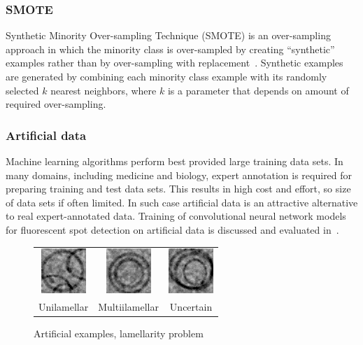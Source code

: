 \documentclass[a4paper, 11pt, table]{article}
\begin{document}
\subsubsection{SMOTE}
Synthetic Minority Over-sampling Technique (SMOTE) is an over-sampling approach in which the minority class is over-sampled by creating “synthetic” examples rather than by over-sampling with replacement~\cite{smote_chawla}. 
Synthetic examples are generated by combining each minority class example with its randomly selected $k$ nearest neighbors, where $k$ is a parameter that depends on amount of required over-sampling.

\subsubsection{Artificial data}
Machine learning algorithms perform best provided large training data sets. In many domains, including medicine and biology, expert annotation is required for preparing training and test data sets. This results in high cost and effort, so size of data sets if often limited. In such case artificial data is an attractive alternative to real expert-annotated data. Training of convolutional neural network models for fluorescent spot detection on artificial data is discussed and evaluated in~\cite{ishaq_synthetic}. 

\begin{figure}[H]
\centering
\begin{tabular}{ccc}
	\includegraphics[scale=1.5]{synthetic/uni.png} & \includegraphics[scale=1.5]{synthetic/multi.png} & \includegraphics[scale=1.5]{synthetic/uncertain.png} \\
	Unilamellar & Multiilamellar & Uncertain \\[6pt]
\end{tabular}
\caption{Artificial examples, lamellarity problem}
\label{fig:synthetic_images}
\end{figure}
\end{document}
